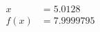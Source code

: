 \documentclass[preview]{standalone}
\begin{document}
\begin{align*}
x &= 5.0128\\f(x) &= 7.9999795
\end{align*}
\end{document}
